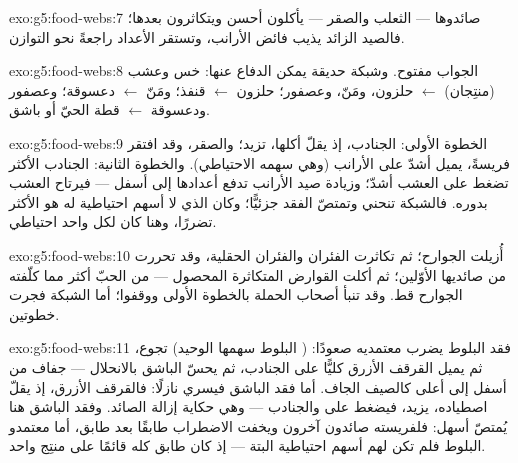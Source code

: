 \begin{solution}{exo:g5:food-webs:7}
صائدوها --- الثعلب والصقر --- يأكلون أحسن ويتكاثرون بعدها؛
فالصيد الزائد يذيب فائض الأرانب، وتستقر الأعداد راجعةً نحو
التوازن.
\end{solution}

\begin{solution}{exo:g5:food-webs:8}
الجواب مفتوح. وشبكة حديقة يمكن الدفاع عنها: خس وعشب
(منتِجان) $\leftarrow$ حلزون، ومَنّ، وعصفور؛
حلزون $\leftarrow$ قنفذ؛ ومَنّ $\leftarrow$ دعسوقة؛
وعصفور ودعسوقة $\leftarrow$ قطة الحيّ أو
باشق.
\end{solution}

\begin{solution}{exo:g5:food-webs:9}
الخطوة الأولى: الجنادب، إذ يقلّ أكلها، تزيد؛ والصقر، وقد افتقر
فريسةً، يميل أشدّ على الأرانب (وهي سهمه الاحتياطي). والخطوة
الثانية: الجنادب الأكثر تضغط على العشب أشدّ؛ وزيادة صيد الأرانب
تدفع أعدادها إلى أسفل --- فيرتاح العشب بدوره. فالشبكة تنحني
وتمتصّ الفقد جزئيًّا؛ وكان  الذي لا أسهم احتياطية له هو
الأكثر تضررًا، وهنا كان لكل واحد احتياطي.
\end{solution}

\begin{solution}{exo:g5:food-webs:10}
أُزيلت الجوارح؛ ثم تكاثرت الفئران والفئران الحقلية، وقد تحررت من
صائديها الأوّلين؛ ثم أكلت القوارض المتكاثرة المحصول --- من الحبّ
أكثر مما كلّفته الجوارح قط. وقد تنبأ أصحاب الحملة بالخطوة الأولى
ووقفوا؛ أما الشبكة فجرت خطوتين.
\end{solution}

\begin{solution}{exo:g5:food-webs:11}
فقد البلوط يضرب معتمديه صعودًا:  ( البلوط سهمها
الوحيد) تجوع، ثم يميل القرقف الأزرق كليًّا على الجنادب، ثم يحسّ
الباشق بالانحلال --- جفاف من أسفل إلى أعلى كالصيف الجاف. أما فقد
الباشق فيسري نازلًا: فالقرقف الأزرق، إذ يقلّ اصطياده، يزيد،
فيضغط على  والجنادب --- وهي حكاية إزالة الصائد. وفقد
الباشق هنا يُمتصّ أسهل: فلفريسته صائدون آخرون ويخفت الاضطراب
طابقًا بعد طابق، أما معتمدو البلوط فلم تكن لهم أسهم احتياطية
البتة --- إذ كان طابق  كله قائمًا على منتِج واحد.
\end{solution}
